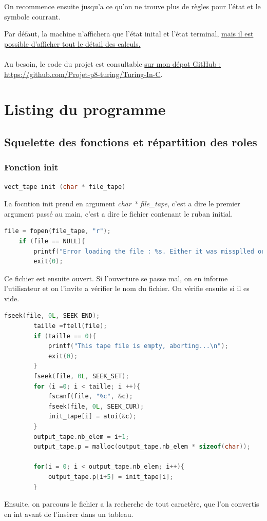 \documentclass[12pt,a4paper]{report}
\begin{document}
\begin{itemize}
On recommence ensuite jusqu'a ce qu'on ne trouve plus de règles pour l'état et le symbole courrant.

Par défaut, la machine n'affichera que l'état inital et l'état terminal, \hyperref[chap:emploi]{mais il est possible d'afficher tout le détail des calculs.}\\\\
Au besoin, le code du projet est consultable \href{https://github.com/Projet-p8-turing/Turing-In-C}{sur mon dépot GitHub : https://github.com/Projet-p8-turing/Turing-In-C}.
\end{itemize}
\chapter{Listing du programme}
\section{Squelette des fonctions et répartition des roles}
\subsection{Fonction init}
\begin{lstlisting}[language=c]
vect_tape init (char * file_tape)
\end{lstlisting}
La focntion init prend en argument \textit{char * file\_tape}, c'est a dire le premier argument passé au main, c'est a dire le fichier contenant le ruban initial.\\
\begin{lstlisting}[language=c]
file = fopen(file_tape, "r"); 
	if (file == NULL){ 
		printf("Error loading the file : %s. Either it was missplled or it does not exist.\n", file_tape); 
		exit(0);
\end{lstlisting}
Ce fichier est ensuite ouvert. Si l'ouverture se passe mal, on en informe l'utilisateur et on l'invite a vérifier le nom du fichier. On vérifie ensuite si il es vide.\\
\begin{lstlisting}[language=c]
        fseek(file, 0L, SEEK_END);
		taille =ftell(file);
		if (taille == 0){
			printf("This tape file is empty, aborting...\n");
			exit(0);
		}
		fseek(file, 0L, SEEK_SET);
		for (i =0; i < taille; i ++){
			fscanf(file, "%c", &c);
			fseek(file, 0L, SEEK_CUR);
			init_tape[i] = atoi(&c); 
		}	
		output_tape.nb_elem = i+1;
		output_tape.p = malloc(output_tape.nb_elem * sizeof(char));

		for(i = 0; i < output_tape.nb_elem; i++){
			output_tape.p[i+5] = init_tape[i];
		}
\end{lstlisting}
Ensuite, on parcours le fichier a la recherche de tout caractère, que l'on convertis en int avant de l'insèrer dans un tableau.\\
\end{document}
